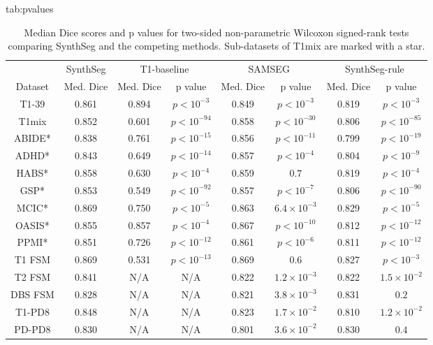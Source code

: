 \documentclass{midl}
\newcommand{\netname}{SynthSeg}
\begin{document}
\begin{table}[tbp]
\setlength\tabcolsep{3pt} 
\floatconts
  {tab:pvalues}
  {\caption{Median Dice scores and p values for two-sided non-parametric Wilcoxon signed-rank tests comparing \netname{} and the competing methods. Sub-datasets of T1mix are marked with a star.}}
  {\small \begin{tabular}{|c|c|c|c|c|c|c|c|}
  \hline
  & \netname{}  & \multicolumn{2}{c|}{T1-baseline}  &  \multicolumn{2}{c|}{SAMSEG} &   \multicolumn{2}{c|}{\netname{}-rule}  \\ \cline{2-8}
  Dataset  & Med. Dice  &  Med. Dice & p value  &   Med. Dice &  p value  &  Med. Dice  &  p value   \\ 
  \hline
  T1-39   & 0.861 & 0.894 & $p<10^{-3}$ &   {0.849} & $p<10^{-3}$  &  {0.819} & $p<10^{-3}$    \\ 
  T1mix   & 0.852 &  {0.601} & $p<10^{-94}$  & 0.858 & $p<10^{-30}$ & {0.806} & $p<10^{-85}$  \\ 
  ABIDE*  & 0.838 & {0.761} & $p<10^{-15}$  & 0.856 & $p<10^{-11}$   & {0.799} & $p<10^{-19}$  \\ 
  ADHD*   & 0.843  & {0.649} & $p<10^{-14}$  & 0.857 & $p<10^{-4}$   & {0.804} & $p<10^{-9}$  \\ 
  HABS*   & 0.858 & {0.630} & $p<10^{-4}$  & 0.859 & $0.7$  &  {0.819} & $p<10^{-4}$  \\ 
  GSP*    & 0.853  & {0.549} & $p<10^{-92}$  & 0.857 & $p<10^{-7}$  &  {0.806} & $p<10^{-90}$  \\ 
  MCIC*   & 0.869  & {0.750} & $p<10^{-5}$  & {0.863} & $ 6.4 \times 10^{-3}$  &  {0.829} & $p<10^{-5}$  \\ 
  OASIS*  & 0.855  & 0.857 & $p<10^{-4}$  & 0.867 & $p<10^{-10}$  &  {0.812} & $p<10^{-12}$  \\ 
  PPMI*   & 0.851  & {0.726} & $p<10^{-12}$  & 0.861 & $p<10^{-6}$  &  {0.811} & $p<10^{-12}$  \\
  T1 FSM  & 0.869  & {0.531} & $p<10^{-13}$  & 0.869 & $0.6$  &  {0.827} & $p<10^{-3}$  \\
  T2 FSM  & 0.841   & N/A   & N/A & {0.822} & $ 1.2 \times 10^{-3}$  &  {0.822} & $ 1.5 \times 10^{-2}$  \\  
  DBS FSM & 0.828  & N/A & N/A  & {0.821} & $ 3.8 \times 10^{-3}$  &  0.831 & $ 0.2$  \\                 
  T1-PD8  & 0.848  & N/A & N/A  & {0.823} & $ 1.7 \times 10^{-2}$  &  {0.810} & $ 1.2 \times 10^{-2}$  \\  
  PD-PD8  & 0.830  & N/A  & N/A  & {0.801} & $ 3.6 \times 10^{-2}$  &  0.830 & $ 0.4$  \\   
  \hline
  \end{tabular}}
\end{table}
\end{document}
